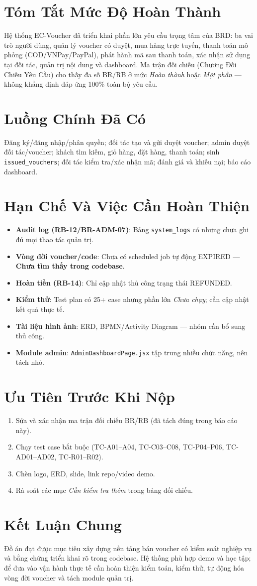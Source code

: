 \section{Tóm Tắt Mức Độ Hoàn Thành}
Hệ thống EC-Voucher đã triển khai phần lớn yêu cầu trọng tâm của BRD: ba vai trò người dùng, quản lý voucher có duyệt, mua hàng trực tuyến, thanh toán mô phỏng (COD/VNPay/PayPal), phát hành mã sau thanh toán, xác nhận sử dụng tại đối tác, quản trị nội dung và dashboard. Ma trận đối chiếu (Chương Đối Chiếu Yêu Cầu) cho thấy đa số BR/RB ở mức \textit{Hoàn thành} hoặc \textit{Một phần} — không khẳng định đáp ứng 100\% toàn bộ yêu cầu.

\section{Luồng Chính Đã Có}
Đăng ký/đăng nhập/phân quyền; đối tác tạo và gửi duyệt voucher; admin duyệt đối tác/voucher; khách tìm kiếm, giỏ hàng, đặt hàng, thanh toán; sinh \texttt{issued\_vouchers}; đối tác kiểm tra/xác nhận mã; đánh giá và khiếu nại; báo cáo dashboard.

\section{Hạn Chế Và Việc Cần Hoàn Thiện}
\begin{itemize}[leftmargin=1.2cm]
  \item \textbf{Audit log (RB-12/BR-ADM-07)}: Bảng \texttt{system\_logs} có nhưng chưa ghi đủ mọi thao tác quản trị.
  \item \textbf{Vòng đời voucher/code}: Chưa có scheduled job tự động EXPIRED — \textbf{Chưa tìm thấy trong codebase}.
  \item \textbf{Hoàn tiền (RB-14)}: Chỉ cập nhật thủ công trạng thái REFUNDED.
  \item \textbf{Kiểm thử}: Test plan có 25+ case nhưng phần lớn \textit{Chưa chạy}; cần cập nhật kết quả thực tế.
  \item \textbf{Tài liệu hình ảnh}: ERD, BPMN/Activity Diagram — nhóm cần bổ sung thủ công.
  \item \textbf{Module admin}: \texttt{AdminDashboardPage.jsx} tập trung nhiều chức năng, nên tách nhỏ.
\end{itemize}

\section{Ưu Tiên Trước Khi Nộp}
\begin{enumerate}[leftmargin=1.5cm]
  \item Sửa và xác nhận ma trận đối chiếu BR/RB (đã tách đúng trong báo cáo này).
  \item Chạy test case bắt buộc (TC-A01--A04, TC-C03--C08, TC-P04--P06, TC-AD01--AD02, TC-R01--R02).
  \item Chèn logo, ERD, slide, link repo/video demo.
  \item Rà soát các mục \textit{Cần kiểm tra thêm} trong bảng đối chiếu.
\end{enumerate}

\section{Kết Luận Chung}
Đồ án đạt được mục tiêu xây dựng nền tảng bán voucher có kiểm soát nghiệp vụ và bằng chứng triển khai rõ trong codebase. Hệ thống phù hợp demo và học tập; để đưa vào vận hành thực tế cần hoàn thiện kiểm toán, kiểm thử, tự động hóa vòng đời voucher và tách module quản trị.
